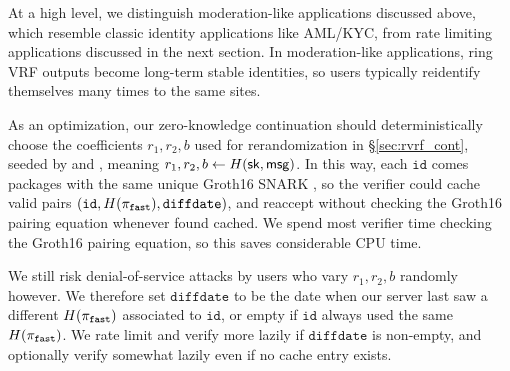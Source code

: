 At a high level, we distinguish moderation-like applications discussed
above, which resemble classic identity applications like AML/KYC, from
rate limiting applications discussed in the next section. 
%
In moderation-like applications, ring VRF outputs become long-term
stable identities, so users typically reidentify themselves many times
to the same sites.

As an optimization, our zero-knowledge continuation
should deterministically choose the coefficients $r_1,r_2,b$ used for
rerandomization in \S\ref{sec:rvrf_cont},
 seeded by \msg and \sk, meaning $r_1,r_2,b \leftarrow H(\mathsf{sk},\mathsf{msg})$. 
%
In this way, each $\mathtt{id}$ comes packages with the same unique
Groth16 SNARK \pifast, so the verifier could cache valid pairs
$(\mathtt{id},H(\pi_{\mathtt{fast}}),\mathtt{diffdate})$, and reaccept \pifast
without checking the Groth16 pairing equation whenever found cached.
%
We spend most verifier time checking the Groth16 pairing equation, so
this saves considerable CPU time. %

We still risk denial-of-service attacks by users who vary $r_1,r_2,b$ 
randomly however.  We therefore set $\mathtt{diffdate}$ to be the date
when our server last saw a different $H(\pi_{\mathtt{fast}})$ associated to
$\mathtt{id}$, or empty if $\mathtt{id}$ always used the same $H(\pi_{\mathtt{fast}})$.
We rate limit and verify more lazily if $\mathtt{diffdate}$ is non-empty,
and optionally verify somewhat lazily even if no cache entry exists.

